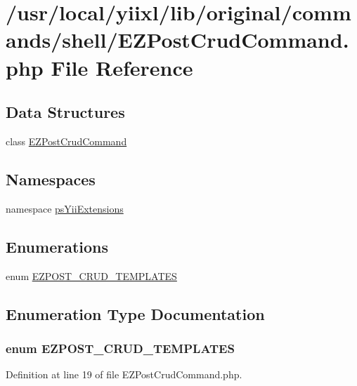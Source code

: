 \hypertarget{EZPostCrudCommand_8php}{
\section{/usr/local/yiixl/lib/original/commands/shell/EZPostCrudCommand.php File Reference}
\label{EZPostCrudCommand_8php}
}
\subsection*{Data Structures}
\begin{DoxyCompactItemize}
\item 
class \hyperlink{classEZPostCrudCommand}{EZPostCrudCommand}
\end{DoxyCompactItemize}
\subsection*{Namespaces}
\begin{DoxyCompactItemize}
\item 
namespace \hyperlink{namespacepsYiiExtensions}{psYiiExtensions}
\end{DoxyCompactItemize}
\subsection*{Enumerations}
\begin{DoxyCompactItemize}
\item 
enum \hyperlink{EZPostCrudCommand_8php_a18cad219e51332ab69d12391c75f8d41}{EZPOST\_\-CRUD\_\-TEMPLATES} 
\end{DoxyCompactItemize}


\subsection{Enumeration Type Documentation}
\hypertarget{EZPostCrudCommand_8php_a18cad219e51332ab69d12391c75f8d41}{
\subsubsection[{EZPOST\_\-CRUD\_\-TEMPLATES}]{\setlength{\rightskip}{0pt plus 5cm}enum {\bf EZPOST\_\-CRUD\_\-TEMPLATES}}}
\label{EZPostCrudCommand_8php_a18cad219e51332ab69d12391c75f8d41}


Definition at line 19 of file EZPostCrudCommand.php.

